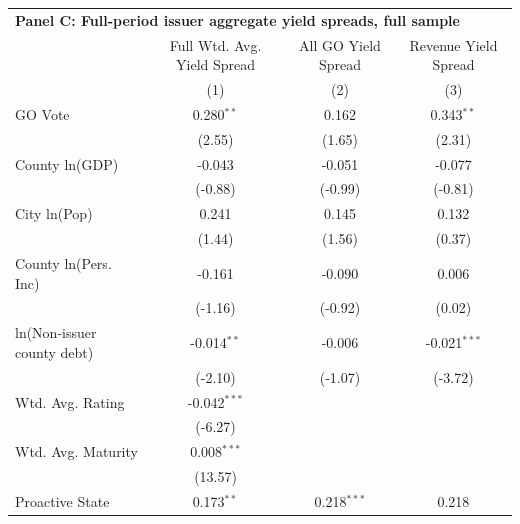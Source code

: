 \begingroup
\small
\centering
\begin{tabular*}{\textwidth}{@{\extracolsep{\fill}}lccc}
\multicolumn{4}{l}{\textbf{Panel C: Full-period issuer aggregate yield spreads, full sample}}\\

\addlinespace
   \toprule
                              & Full Wtd. Avg. Yield Spread & All GO Yield Spread & Revenue Yield Spread\\  
                              & (1)                         & (2)                 & (3)\\  
   \midrule 
   GO Vote                    & 0.280$^{**}$                & 0.162               & 0.343$^{**}$\\   
                              & (2.55)                     & (1.65)             & (2.31)\\   
   County ln(GDP)             & -0.043                      & -0.051              & -0.077\\   
                              & (-0.88)                    & (-0.99)            & (-0.81)\\   
   City ln(Pop)               & 0.241                       & 0.145               & 0.132\\   
                              & (1.44)                     & (1.56)             & (0.37)\\   
   County ln(Pers. Inc)       & -0.161                      & -0.090              & 0.006\\   
                              & (-1.16)                    & (-0.92)            & (0.02)\\   
   ln(Non-issuer county debt) & -0.014$^{**}$               & -0.006              & -0.021$^{***}$\\   
                              & (-2.10)                    & (-1.07)            & (-3.72)\\   
   Wtd. Avg. Rating           & -0.042$^{***}$              &                     &   \\   
                              & (-6.27)                    &                     &   \\   
   Wtd. Avg. Maturity         & 0.008$^{***}$               &                     &   \\   
                              & (13.57)                    &                     &   \\   
   Proactive State            & 0.173$^{**}$                & 0.218$^{***}$       & 0.218\\   

\end{tabular*}
